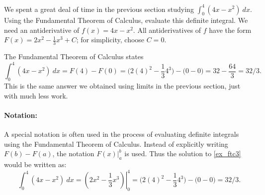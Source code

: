 
\begin{example}\label{ex_ftc3}
We spent a great deal of time in the previous section studying $\int_0^4(4x-x^2)\ dx$. Using the Fundamental Theorem of Calculus, evaluate this definite integral.
\solution
We need an antiderivative of $f(x)=4x-x^2$. All antiderivatives of $f$ have the form $F(x) = 2x^2-\frac13x^3+C$; for simplicity, choose $C=0$.

The Fundamental Theorem of Calculus states
\[
\int_0^4(4x-x^2)\ dx = F(4)-F(0)
= \big(2(4)^2-\frac134^3\big)-\big(0-0\big) = 32-\frac{64}3 = 32/3.
\]
This is the same answer we obtained using limits in the previous section, just with much less work.
\end{example}

\paragraph{Notation:}%
A special notation is often used in the process of evaluating definite integrals using the Fundamental Theorem of Calculus. Instead of explicitly writing $F(b)-F(a)$, the notation $F(x)\Big|_a^b$ is used. Thus the solution to \autoref{ex_ftc3} would be written as:
\[
\int_0^4(4x-x^2)\ dx = \left.\left(2x^2-\frac13x^3\right)\right|_0^4
= \big(2(4)^2-\frac134^3\big)-\big(0-0\big) =  32/3.
\]


